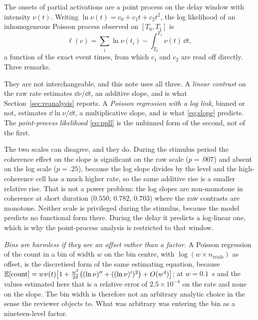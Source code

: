  The onsets of partial activations are
a point process on the delay window with intensity $\nu(t)$. Writing
$\ln\nu(t)=c_0+c_1t+c_2t^{2}$, the log likelihood of an inhomogeneous Poisson process
observed on $[T_0,T_1]$ is
\begin{equation}
\ell(c)=\sum_i \ln\nu(t_i)-\int_{T_0}^{T_1}\nu(t)\,\dd t,
\label{eq:ppll}
\end{equation}
a function of the exact event times, from which $c_1$ and $c_2$ are read off directly.
Three remarks.

 They are not interchangeable, and this note uses all
three. A \emph{linear contrast} on the raw rate estimates $\dd\nu/\dd t$, an additive
slope, and is what Section~\ref{sec:reanalysis} reports. A \emph{Poisson regression with
a log link}, binned or not, estimates $\dd\ln\nu/\dd t$, a multiplicative slope, and is
what \eqref{eq:slope} predicts. The \emph{point-process likelihood} \eqref{eq:ppll}
is the unbinned form of the second, not of the first.

The two scales can disagree, and they do. During the stimulus period the coherence
effect on the slope is significant on the raw scale ($p=.007$) and absent on the log
scale ($p=.25$), because the log slope divides by the level and the high-coherence cell
has a much higher rate, so the same additive rise is a smaller relative rise. That is
not a power problem: the log slopes are non-monotone in coherence at short duration
($0.550$, $0.782$, $0.703$) where the raw contrasts are monotone. Neither scale is
privileged during the stimulus, because the model predicts no functional form there.
During the delay it predicts a log-linear one, which is why the point-process analysis
is restricted to that window.

\emph{Bins are harmless if they are an offset rather than a factor.} A Poisson
regression of the count in a bin of width $w$ on the bin centre, with $\log(w\times
n_{\text{trials}})$ as offset, is the discretised form of the same estimating equation,
because
$\mathbb E[\text{count}]=w\nu(t)\bigl[1+\tfrac{w^{2}}{24}\bigl((\ln\nu)''+((\ln\nu)')^{2}\bigr)+O(w^{4})\bigr]$;
at $w=0.1$~s and the values estimated here that is a relative error of
$2.5\times10^{-4}$ on the rate and none on the slope. The bin width is therefore not an
arbitrary analytic choice in the sense the reviewer objects to. What was arbitrary was
entering the bin as a nineteen-level factor.

